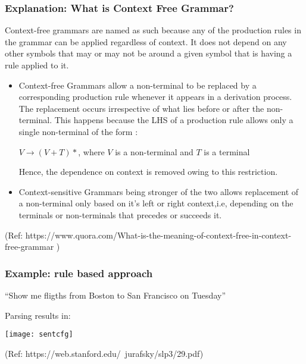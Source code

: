 \begin{frame}[fragile]\frametitle{Explanation: What is Context Free Grammar?}
Context-free grammars are named as such because any of the production rules in the grammar can be applied regardless of context. It does not depend on any other symbols that may or may not be around a given symbol that is having a rule applied to it.

  \begin{itemize}
    \item Context-free Grammars allow a non-terminal to be replaced by a corresponding production rule whenever it appears in a derivation process. The replacement occurs irrespective of what lies before or after the non-terminal. This happens because the LHS of a production rule allows only a single non-terminal of the form :
 
$V \rightarrow (V + T)*$, where $V$ is a non-terminal and $T$ is a terminal

Hence, the dependence on context is removed owing to this restriction.

    \item Context-sensitive Grammars being stronger of the two allows replacement of a non-terminal only based on it’s left or right context,i.e, depending on the terminals or non-terminals that precedes or succeeds it.
  \end{itemize}

{\tiny  (Ref: https://www.quora.com/What-is-the-meaning-of-context-free-in-context-free-grammar )}
\end{frame}



\begin{frame}[fragile]\frametitle{Example: rule based approach}

``Show me fligths from Boston to San Francisco on Tuesday''

Parsing results in:

\begin{center}
\texttt{[image: sentcfg]}
\end{center}

{\tiny (Ref: https://web.stanford.edu/~jurafsky/slp3/29.pdf)}
\end{frame}

